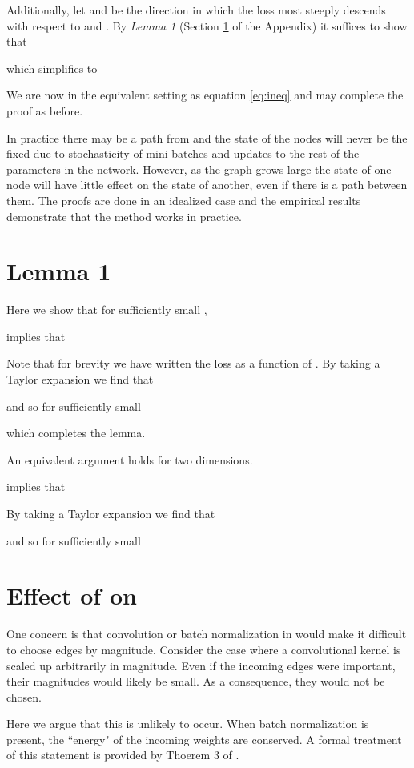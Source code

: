 \documentclass{article}
\begin{document}
Additionally, let  and  be the direction in which the loss most steeply descends with respect to  and . By \textit{Lemma 1} (Section \ref{section:lemma1} of the Appendix) it suffices to show that

which simplifies to

We are now in the equivalent setting as equation \ref{eq:ineq} and may complete the proof as before.

In practice there may be a path from  and  the state of the nodes will never be the fixed due to stochasticity of mini-batches and updates to the rest of the parameters in the network. However, as the graph grows large the state of one node will have little effect on the state of another, even if there is a path between them. The proofs are done in an idealized case and the empirical results demonstrate that the method works in practice.

\section{Lemma 1} \label{section:lemma1}

Here we show that for sufficiently small ,

implies that

Note that for brevity we have written the loss as a function of . By taking a Taylor expansion we find that

and so for sufficiently small 

which completes the lemma.

An equivalent argument holds for two dimensions.

implies that

By taking a Taylor expansion we find that

and so for sufficiently small 


\section{Effect of  on } \label{sec:scale}

One concern is that convolution or batch normalization \cite{batchnorm} in  would make it difficult to choose edges by magnitude. Consider the case where a convolutional kernel is scaled up arbitrarily in magnitude. Even if the incoming edges were important, their magnitudes would likely be small. As a consequence, they would not be chosen.

Here we argue that this is unlikely to occur. When batch normalization \cite{batchnorm} is present, the ``energy" of the incoming weights are conserved. A formal treatment of this statement is provided by Thoerem 3 of \cite{luck}.
\end{document}
